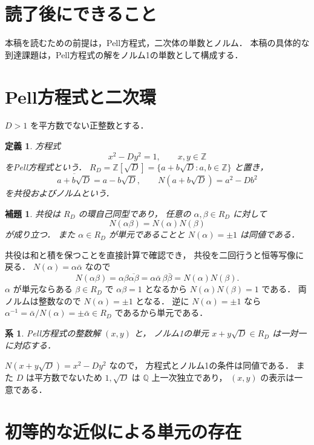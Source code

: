 \documentclass[a5paper,10pt,onecolumn]{jsarticle}
\makeatletter
\theoremstyle{mathnotetheorem}
\newtheorem{definition}[theorem]{定義}
\newtheorem{lemma}[theorem]{補題}
\newtheorem{corollary}[theorem]{系}
\renewcommand{\proofname}{証明}
\renewenvironment{proof}[1][\proofname]{%
  \par\pushQED{\qed}\normalfont\topsep4\p@\@plus2\p@\relax
  \trivlist\item[\hskip\labelsep\bfseries #1]\ignorespaces
}{\popQED\endtrivlist\@endpefalse}
\makeatother
\begin{document}
\section*{読了後にできること}
本稿を読むための前提は，Pell方程式，二次体の単数とノルム．
本稿の具体的な到達課題は，Pell方程式の解をノルム1の単数として構成する．

\section{Pell方程式と二次環}

$D>1$ を平方数でない正整数とする．
\begin{definition}
方程式
\[
 x^2-Dy^2=1,\qquad x,y\in\mathbb Z
\]
を\emph{Pell方程式}という．
$R_D=\mathbb Z[\sqrt D]
 =\{a+b\sqrt D:a,b\in\mathbb Z\}$
と置き，
\[
 \overline{a+b\sqrt D}=a-b\sqrt D,\qquad
 N(a+b\sqrt D)=a^2-Db^2
\]
を共役およびノルムという．
\end{definition}

\begin{lemma}\label{lem:norm}
共役は $R_D$ の環自己同型であり，
任意の $\alpha,\beta\in R_D$ に対して
\[
 N(\alpha\beta)=N(\alpha)N(\beta)
\]
が成り立つ．
また $\alpha\in R_D$ が単元であることと
$N(\alpha)=\pm1$ は同値である．
\end{lemma}
\begin{proof}
共役は和と積を保つことを直接計算で確認でき，
共役を二回行うと恒等写像に戻る．
$N(\alpha)=\alpha\bar\alpha$ なので
\[
 N(\alpha\beta)
 =\alpha\beta\overline{\alpha\beta}
 =\alpha\bar\alpha\,\beta\bar\beta
 =N(\alpha)N(\beta).
\]
$\alpha$ が単元ならある $\beta\in R_D$ で
$\alpha\beta=1$ となるから
$N(\alpha)N(\beta)=1$ である．
両ノルムは整数なので $N(\alpha)=\pm1$ となる．
逆に $N(\alpha)=\pm1$ なら
$\alpha^{-1}=\bar\alpha/N(\alpha)=\pm\bar\alpha\in R_D$
であるから単元である．
\end{proof}

\begin{corollary}
Pell方程式の整数解 $(x,y)$ と，
ノルム1の単元 $x+y\sqrt D\in R_D$ は一対一に対応する．
\end{corollary}
\begin{proof}
$N(x+y\sqrt D)=x^2-Dy^2$ なので，
方程式とノルム1の条件は同値である．
また $D$ は平方数でないため $1,\sqrt D$ は
$\mathbb Q$ 上一次独立であり，
$(x,y)$ の表示は一意である．
\end{proof}

\section{初等的な近似による単元の存在}
\end{document}
